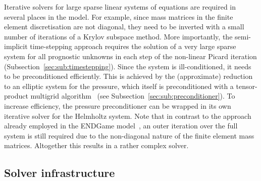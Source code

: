 \documentclass[times]{elsarticle}
\begin{document}
Iterative solvers for large sparse linear systems of equations are
required in several places in the model. For example, since mass
matrices in the finite element discretisation are not diagonal, they
need to be inverted with a small number of iterations of a Krylov
subspace method. More importantly, the semi-implicit time-stepping
approach requires the solution of a very large sparse system for all
prognostic unknowns in each step of the non-linear Picard
iteration (Subsection~\ref{sec:sub:timestepping}). 
Since the system is ill-conditioned, it needs to be
preconditioned efficiently. This is achieved by the (approximate)
reduction to an elliptic system for the pressure, which itself is
preconditioned with a tensor-product multigrid algorithm~\cite{Borm2001} 
(see Subsection~\ref{sec:sub:preconditioner}). To increase
efficiency, the pressure preconditioner can be wrapped in its own
iterative solver for the Helmholtz system. Note that in contrast to
the approach already employed in the ENDGame model~\cite{QJ:QJ2235},
an outer iteration over the full system is still required due to the
non-diagonal nature of the finite element mass matrices. Altogether
this results in a rather complex solver.

\subsection{Solver infrastructure}
\end{document}
